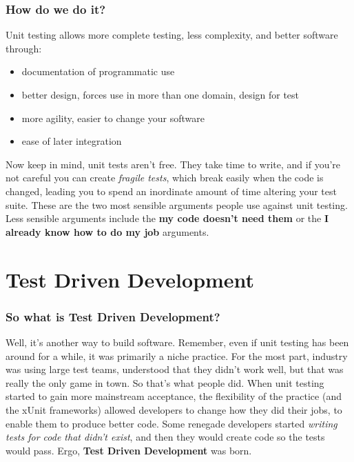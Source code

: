 \documentclass[t, 10pt]{beamer}
\begin{document}
\begin{frame}
\frametitle{How do we do it?}
Unit testing allows more complete testing, less complexity, and better software through:
\begin{itemize}
\item documentation of programmatic use
\item better design, forces use in more than one domain, design for test
\item more agility, easier to change your software
\item ease of later integration
\end{itemize}
Now keep in mind, unit tests aren't free.
\newline
\newline
They take time to write, and if you're not careful you can create \textit{fragile tests}, which break easily when the code is changed, leading you to spend an inordinate amount of time altering your test suite.  These are the two most sensible arguments people use against unit testing.  Less sensible arguments include the \textbf{my code doesn't need them} or the \textbf{I already know how to do my job} arguments.
\end{frame}

\section{Test Driven Development}

\begin{frame}
\frametitle{So what is Test Driven Development?}
Well, it's another way to build software.
\newline
\newline
Remember, even if unit testing has been around for a while, it was primarily a niche practice.  For the most part, industry was using large test teams, understood that they didn't work well, but that was really the only game in town.  So that's what people did.  When unit testing started to gain more mainstream acceptance, the flexibility of the practice (and the xUnit frameworks) allowed developers to change how they did their jobs, to enable them to produce better code.
\newline
\newline
Some renegade developers started \textit{writing tests for code that didn't exist}, and then they would create code so the tests would pass.
\newline
\newline
Ergo, \textbf{Test Driven Development} was born.
\end{frame}
\end{document}
